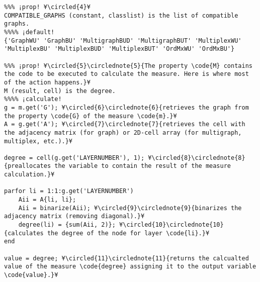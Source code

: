 \documentclass{tufte-handout}
\begin{document}
\begin{lstlisting}
%%% ¡prop! ¥\circled{4}¥
COMPATIBLE_GRAPHS (constant, classlist) is the list of compatible graphs.
%%%% ¡default!
{'GraphWU' 'GraphBU' 'MultigraphBUD' 'MultigraphBUT' 'MultiplexWU' 'MultiplexBU' 'MultiplexBUD' 'MultiplexBUT' 'OrdMxWU' 'OrdMxBU'}

%%% ¡prop! ¥\circled{5}\circlednote{5}{The property \code{M} contains the code to be executed to calculate the measure. Here is where most of the action happens.}¥
M (result, cell) is the degree.
%%%% ¡calculate!
g = m.get('G'); ¥\circled{6}\circlednote{6}{retrieves the graph from the property \code{G} of the measure \code{m}.}¥
A = g.get('A'); ¥\circled{7}\circlednote{7}{retrieves the cell with the adjacency matrix (for graph) or 2D-cell array (for multigraph, multiplex, etc.).}¥

degree = cell(g.get('LAYERNUMBER'), 1); ¥\circled{8}\circlednote{8}{preallocates the variable to contain the result of the measure calculation.}¥

parfor li = 1:1:g.get('LAYERNUMBER')
    Aii = A{li, li};
    Aii = binarize(Aii); ¥\circled{9}\circlednote{9}{binarizes the adjacency matrix (removing diagonal).}¥
    degree(li) = {sum(Aii, 2)}; ¥\circled{10}\circlednote{10}{calculates the degree of the node for layer \code{li}.}¥
end

value = degree; ¥\circled{11}\circlednote{11}{returns the calcualted value of the measure \code{degree} assigning it to the output variable \code{value}.}¥
\end{lstlisting}
\end{document}
